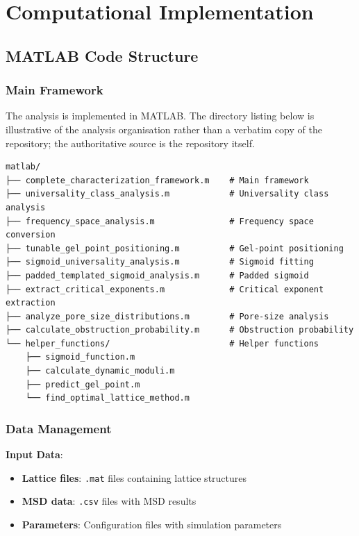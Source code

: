 \section{Computational Implementation}
\label{app:computational}

\subsection{MATLAB Code Structure}

\subsubsection{Main Framework}
The analysis is implemented in MATLAB. The directory listing below is illustrative of the analysis organisation rather than a verbatim copy of the repository; the authoritative source is the repository itself.

\begin{verbatim}
matlab/
├── complete_characterization_framework.m    # Main framework
├── universality_class_analysis.m            # Universality class analysis
├── frequency_space_analysis.m               # Frequency space conversion
├── tunable_gel_point_positioning.m          # Gel-point positioning
├── sigmoid_universality_analysis.m          # Sigmoid fitting
├── padded_templated_sigmoid_analysis.m      # Padded sigmoid
├── extract_critical_exponents.m             # Critical exponent extraction
├── analyze_pore_size_distributions.m        # Pore-size analysis
├── calculate_obstruction_probability.m      # Obstruction probability
└── helper_functions/                        # Helper functions
    ├── sigmoid_function.m
    ├── calculate_dynamic_moduli.m
    ├── predict_gel_point.m
    └── find_optimal_lattice_method.m
\end{verbatim}

\subsubsection{Data Management}
\textbf{Input Data}:
\begin{itemize}
    \item \textbf{Lattice files}: \texttt{.mat} files containing lattice structures
    \item \textbf{MSD data}: \texttt{.csv} files with MSD results
    \item \textbf{Parameters}: Configuration files with simulation parameters
\end{itemize}

